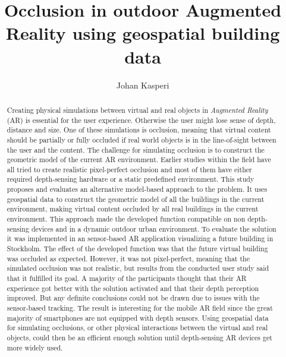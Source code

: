 \documentclass[siggraph]{acmart}
\begin{document}
\title{Occlusion in outdoor Augmented Reality using geospatial building data}

\author{Johan Kasperi}

\begin{abstract}
Creating physical simulations between virtual and real objects in \textit{Augmented Reality} (AR) is essential for the user experience. Otherwise the user might lose sense of depth, distance and size. One of these simulations is occlusion, meaning that virtual content should be partially or fully occluded if real world objects is in the line-of-sight between the user and the content. The challenge for simulating occlusion is to construct the geometric model of the current AR environment. Earlier studies within the field have all tried to create realistic pixel-perfect occlusion and most of them have either required depth-sensing hardware or a static predefined environment. This study proposes and evaluates an alternative model-based approach to the problem. It uses geospatial data to construct the geometric model of all the buildings in the current environment, making virtual content occluded by all real buildings in the current environment. This approach made the developed function compatible on non depth-sensing devices and in a dynamic outdoor urban environment. To evaluate the solution it was implemented in an sensor-based AR application visualizing a future building in Stockholm. The effect of the developed function was that the future virtual building was occluded as expected. However, it was not pixel-perfect, meaning that the simulated occlusion was not realistic, but results from the conducted user study said that it fulfilled its goal. A majority of the participants thought that their AR experience got better with the solution activated and that their depth perception improved. But any definite conclusions could not be drawn due to issues with the sensor-based tracking. The result is interesting for the mobile AR field since the great majority of smartphones are not equipped with depth sensors. Using geospatial data for simulating occlusions, or other physical interactions between the virtual and real objects, could then be an efficient enough solution until depth-sensing AR devices get more widely used.
\end{abstract}


\maketitle





\end{document}

